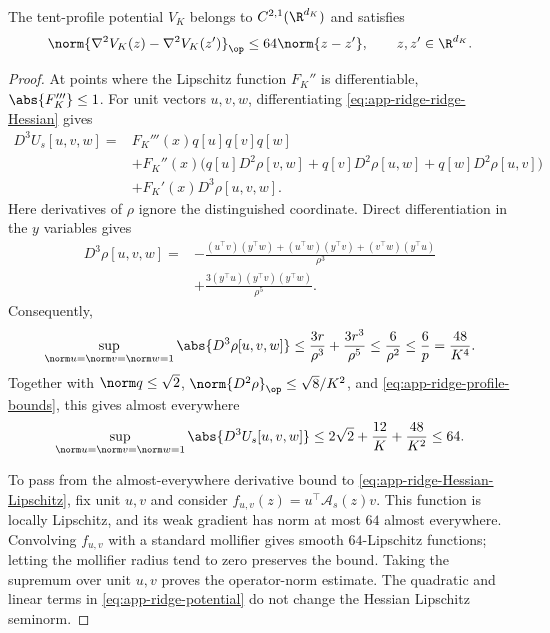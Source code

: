 \begin{lemma}
\label{lem:app-ridge-Hessian-Lipschitz}
The tent-profile potential \(V_K\) belongs to \(C^{2,1}(\R^{d_K})\) and
satisfies
\begin{equation}
  \norm{\nabla^2V_K(z)-\nabla^2V_K(z')}_{\op}
  \leq64\norm{z-z'},
  \qquad z,z'\in\R^{d_K}.
  \label{eq:app-ridge-Hessian-Lipschitz}
\end{equation}
\end{lemma}

\begin{proof}
At points where the Lipschitz function \(F_K''\) is differentiable,
\(\abs{F_K'''}\leq1\).  For unit vectors \(u,v,w\), differentiating
\eqref{eq:app-ridge-ridge-Hessian} gives
\begin{align}
  D^3U_s[u,v,w]
  ={}&
  F_K'''(x)q[u]q[v]q[w]\nonumber\\
  &+
  F_K''(x)\bigl(
    q[u]D^2\rho[v,w]+q[v]D^2\rho[u,w]
    +q[w]D^2\rho[u,v]\bigr)\nonumber\\
  &+
  F_K'(x)D^3\rho[u,v,w].
  \label{eq:app-ridge-third-ridge}
\end{align}
Here derivatives of \(\rho\) ignore the distinguished coordinate.  Direct
differentiation in the \(y\) variables gives
\begin{align*}
  D^3\rho[u,v,w]
  ={}&
  -\frac{
    (u^\top v)(y^\top w)+(u^\top w)(y^\top v)
    +(v^\top w)(y^\top u)}
  {\rho^3}\\
  &+
  \frac{3(y^\top u)(y^\top v)(y^\top w)}{\rho^5}.
\end{align*}
Consequently,
\[
  \sup_{\norm u=\norm v=\norm w=1}
  \abs{D^3\rho[u,v,w]}
  \leq\frac{3r}{\rho^3}+\frac{3r^3}{\rho^5}
  \leq\frac6{\rho^2}
  \leq\frac6p=\frac{48}{K^4}.
\]
Together with
\(\norm q\leq\sqrt2\),
\(\norm{D^2\rho}_{\op}\leq\sqrt8/K^2\), and
\eqref{eq:app-ridge-profile-bounds}, this gives almost everywhere
\[
  \sup_{\norm u=\norm v=\norm w=1}
  \abs{D^3U_s[u,v,w]}
  \leq
  2\sqrt2+\frac{12}{K}+\frac{48}{K^2}
  \leq64.
\]

To pass from the almost-everywhere derivative bound to
\eqref{eq:app-ridge-Hessian-Lipschitz}, fix unit \(u,v\) and consider
\(f_{u,v}(z)=u^\top\mathcal A_s(z)v\).  This function is locally Lipschitz,
and its weak gradient has norm at most \(64\) almost everywhere.
Convolving \(f_{u,v}\) with a standard mollifier gives smooth
\(64\)-Lipschitz functions; letting the mollifier radius tend to zero
preserves the bound.  Taking the supremum over unit \(u,v\) proves the
operator-norm estimate.  The quadratic and linear terms in
\eqref{eq:app-ridge-potential} do not change the Hessian Lipschitz
seminorm.
\end{proof}

